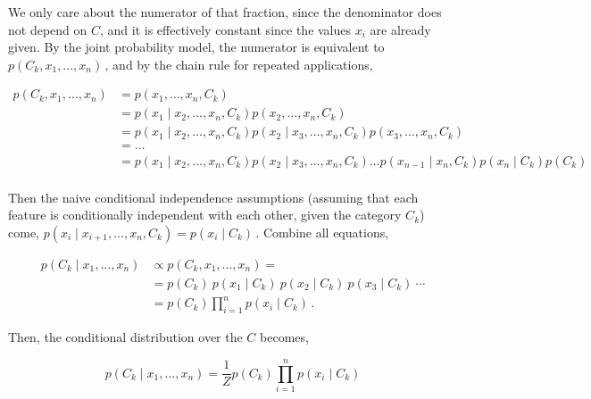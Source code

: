 \documentclass[12pt,a4paper]{report}
\begin{document}
        We only care about the numerator of that fraction, since the denominator does not depend on $C$, and it is effectively constant since the values $x_i$ are already given. By the joint probability model, the numerator is equivalent to $p(C_k, x_1, \dots, x_n)\,$, and by the chain rule for repeated applications,

        $$
          \begin{aligned}
            p(C_k, x_1, \dots, x_n) & = p(x_1, \dots, x_n, C_k)                                                                                                   \\
                                    & = p(x_1 \mid x_2, \dots, x_n, C_k) p(x_2, \dots, x_n, C_k)                                                                  \\
                                    & = p(x_1 \mid x_2, \dots, x_n, C_k) p(x_2 \mid x_3, \dots, x_n, C_k) p(x_3, \dots, x_n, C_k)                                 \\
                                    & = \dots                                                                                                                     \\
                                    & = p(x_1 \mid x_2, \dots, x_n, C_k) p(x_2 \mid x_3, \dots, x_n, C_k) \dots   p(x_{n-1} \mid x_n, C_k) p(x_n \mid C_k) p(C_k) \\
          \end{aligned}
        $$

        Then the naive conditional independence assumptions (assuming that each feature is conditionally independent with each other, given the category $C_k$) come, $p(x_i \mid x_{i+1}, \dots ,x_{n}, C_k ) = p(x_i \mid C_k)\,$. Combine all equations,

        $$
          \begin{aligned}
            p(C_k \mid x_1, \dots, x_n) & \varpropto p(C_k, x_1, \dots, x_n) =                                  \\
                                        & = p(C_k) \ p(x_1 \mid C_k) \ p(x_2\mid C_k) \ p(x_3\mid C_k) \ \cdots \\
                                        & = p(C_k) \prod_{i=1}^n p(x_i \mid C_k)\,.
          \end{aligned}
        $$

        Then, the conditional distribution over the $C$ becomes,

        \[
          p(C_k \mid x_1, \dots, x_n) = \frac{1}{Z} p(C_k) \prod_{i=1}^n p(x_i \mid C_k)
        \]
\end{document}
